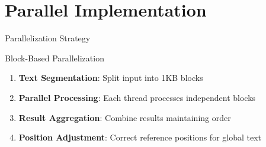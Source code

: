 \documentclass[aspectratio=169]{beamer}
\begin{document}
\section{Parallel Implementation}

\begin{frame}{Parallelization Strategy}
\begin{block}{Block-Based Parallelization}
\begin{enumerate}
    \item \textbf{Text Segmentation}: Split input into 1KB blocks
    \item \textbf{Parallel Processing}: Each thread processes independent blocks
    \item \textbf{Result Aggregation}: Combine results maintaining order
    \item \textbf{Position Adjustment}: Correct reference positions for global text
\end{enumerate}
\end{block}

\vspace{0.3cm}
\begin{center}
\end{center}
\end{frame}
\end{document}
